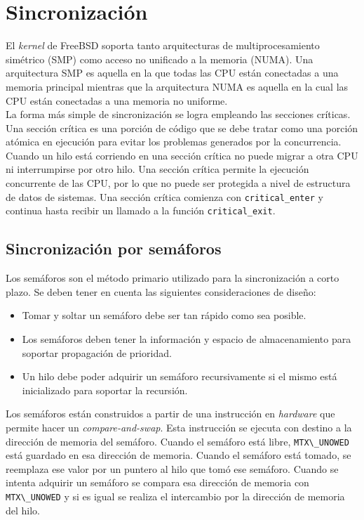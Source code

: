 \documentclass[a4paper]{book}
\begin{document}
\section{Sincronizaci\'on}

El \emph{kernel} de FreeBSD soporta tanto arquitecturas de multiprocesamiento simétrico (SMP) como acceso no unificado a la memoria (NUMA). Una arquitectura SMP es aquella en la que todas las CPU están conectadas a una memoria principal mientras que la arquitectura NUMA es aquella en la cual las CPU están conectadas a una memoria no uniforme.\\

La forma más simple de sincronización se logra empleando las secciones críticas. Una sección crítica es una porción de código que se debe tratar como una porción atómica en ejecución para evitar los problemas generados por la concurrencia. Cuando un hilo está corriendo en una sección crítica no puede migrar a otra CPU ni interrumpirse por otro hilo. Una sección crítica permite la ejecución concurrente de las CPU, por lo que no puede ser protegida a nivel de estructura de datos de sistemas. Una sección crítica comienza con \verb|critical_enter| y continua hasta recibir un llamado a la función \verb|critical_exit|.

\subsection{Sincronizaci\'on por sem\'aforos}

Los sem\'aforos son el m\'etodo primario utilizado para la sincronizaci\'on a corto plazo. Se deben tener en cuenta las siguientes consideraciones de diseño:

\begin{itemize}
\item Tomar y soltar un sem\'aforo debe ser tan r\'apido como sea posible.
\item Los sem\'aforos deben tener la informaci\'on y espacio de almacenamiento para soportar propagaci\'on de prioridad.
\item Un hilo debe poder adquirir un sem\'aforo recursivamente si el mismo est\'a inicializado para soportar la recursi\'on.
\end{itemize}

Los semáforos están construidos a partir de una instrucción en \emph{hardware} que permite hacer un \emph{compare-and-swap}. Esta instrucción se ejecuta con destino a la dirección de memoria del semáforo. Cuando el semáforo está libre, \verb|MTX\_UNOWED| está guardado en esa dirección de memoria. Cuando el semáforo está tomado, se reemplaza ese valor por un puntero al hilo que tomó ese semáforo. Cuando se intenta adquirir un semáforo se compara esa dirección de memoria con \verb|MTX\_UNOWED| y si es igual se realiza el intercambio por la dirección de memoria del hilo.\\
\end{document}
